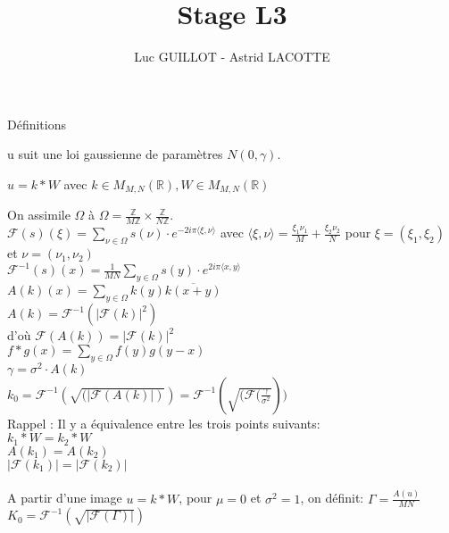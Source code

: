 \documentclass{article} %
\title{\textbf{Stage L3}}
\author{Luc GUILLOT - Astrid LACOTTE}
\begin{document}
\maketitle


\begin{section}{Définitions}

u suit une loi gaussienne de paramètres $N(0, \gamma)$.

$u = k \ast W$ avec $k \in M_{M,N}(\mathbb{R}), W \in M_{M,N}(\mathbb{R})$


On assimile $\Omega$ à $\Omega = \frac{\mathbb{Z}}{M\mathbb{Z}} \times \frac{\mathbb{Z}}{N\mathbb{Z}}$.
\\
$\mathcal{F}(s)(\xi) = \sum_{ \nu \in \Omega}{s(\nu) \cdot e^{-2i \pi \langle \xi,\nu \rangle}}$ avec 
$\langle \xi,\nu \rangle =  \frac{ \xi_1 \nu_1}{M} + \frac{ \xi_2 \nu_2}{N}$ pour $\xi = (\xi_1,\xi_2)$ et $\nu = (\nu_1,\nu_2)$
\\
$\mathcal{F}^{-1}(s)(x) = \frac{1}{MN}\sum_{ y \in \Omega}{s(y) \cdot e^{2i \pi \langle x,y \rangle}}$
\\
$A(k)(x) = \sum_{ y \in \Omega}{k(y)\overline{k(x+y)}}$ \\
$A(k) = \mathcal{F}^{-1}( {\lvert \mathcal{F}(k) \rvert }^2)$
\\
d'où $\mathcal{F}(A(k)) =  {\lvert \mathcal{F}(k) \rvert }^2 $
\\
$f \ast g (x) = \sum_{ y \in \Omega}{f(y)g(y-x)}$
\\
$\gamma = \sigma^{2} \cdot A(k) $
\\
$k_0 = \mathcal{F}^{-1}( \sqrt{(\lvert \mathcal{F}(A(k) \rvert) }) = \mathcal{F}^{-1}( \sqrt{( \mathcal{F}(\frac{\gamma}{\sigma^2}  }))$
\\
Rappel : Il y a équivalence entre les trois points suivants:\\
$k_1 \ast W = k_2 \ast W$
\\
$A(k_1) = A(k_2)$
\\
$\lvert \mathcal{F}(k_1) \rvert = \lvert \mathcal{F}(k_2) \rvert$
\\
\\
A partir d'une image $u = k \ast W$, pour $\mu = 0$ et $\sigma^2 = 1$, on définit:
$\Gamma = \frac{A(u)}{MN}$ \\
$K_0 =  \mathcal{F}^{-1}( \sqrt{\lvert \mathcal{F}(\Gamma) \rvert })$



\end{section}
\end{document}
